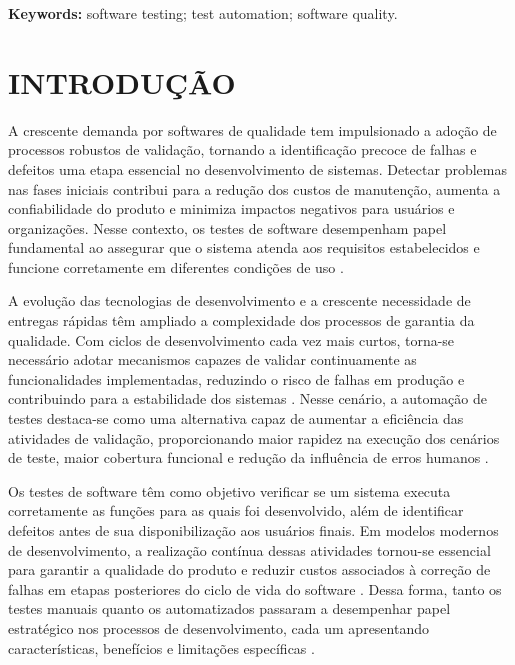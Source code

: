\documentclass{UNESC}
\begin{document}
\vspace{0.5em}
\noindent
\textbf{Keywords:} software testing; test automation; software quality.

\section{INTRODUÇÃO}
A crescente demanda por softwares de qualidade tem impulsionado a adoção de processos robustos de validação, tornando a identificação precoce de falhas e defeitos uma etapa essencial no desenvolvimento de sistemas. Detectar problemas nas fases iniciais contribui para a redução dos custos de manutenção, aumenta a confiabilidade do produto e minimiza impactos negativos para usuários e organizações. Nesse contexto, os testes de software desempenham papel fundamental ao assegurar que o sistema atenda aos requisitos estabelecidos e funcione corretamente em diferentes condições de uso \cite{nucleodoconhecimento}.

A evolução das tecnologias de desenvolvimento e a crescente necessidade de entregas rápidas têm ampliado a complexidade dos processos de garantia da qualidade. Com ciclos de desenvolvimento cada vez mais curtos, torna-se necessário adotar mecanismos capazes de validar continuamente as funcionalidades implementadas, reduzindo o risco de falhas em produção e contribuindo para a estabilidade dos sistemas \cite{souza_automacao_2023}. Nesse cenário, a automação de testes destaca-se como uma alternativa capaz de aumentar a eficiência das atividades de validação, proporcionando maior rapidez na execução dos cenários de teste, maior cobertura funcional e redução da influência de erros humanos \cite{nucleodoconhecimento}.

Os testes de software têm como objetivo verificar se um sistema executa corretamente as funções para as quais foi desenvolvido, além de identificar defeitos antes de sua disponibilização aos usuários finais. Em modelos modernos de desenvolvimento, a realização contínua dessas atividades tornou-se essencial para garantir a qualidade do produto e reduzir custos associados à correção de falhas em etapas posteriores do ciclo de vida do software \cite{SOMMERVILE}. Dessa forma, tanto os testes manuais quanto os automatizados passaram a desempenhar papel estratégico nos processos de desenvolvimento, cada um apresentando características, benefícios e limitações específicas \cite{PRESSMAN}.
\end{document}
